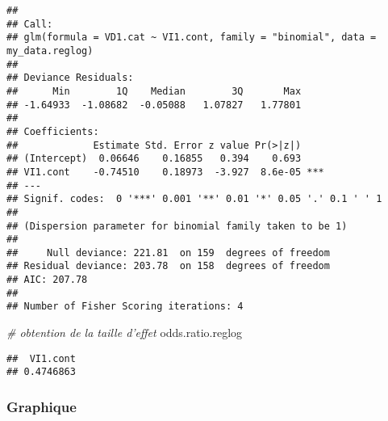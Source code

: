 \documentclass[
]{book}
\newenvironment{Shaded}{\begin{snugshade}}{\end{snugshade}}
\newcommand{\CommentTok}[1]{\textcolor[rgb]{0.56,0.35,0.01}{\textit{#1}}}
\newcommand{\NormalTok}[1]{#1}
\begin{document}
\begin{verbatim}
## 
## Call:
## glm(formula = VD1.cat ~ VI1.cont, family = "binomial", data = my_data.reglog)
## 
## Deviance Residuals: 
##      Min        1Q    Median        3Q       Max  
## -1.64933  -1.08682  -0.05088   1.07827   1.77801  
## 
## Coefficients:
##             Estimate Std. Error z value Pr(>|z|)    
## (Intercept)  0.06646    0.16855   0.394    0.693    
## VI1.cont    -0.74510    0.18973  -3.927  8.6e-05 ***
## ---
## Signif. codes:  0 '***' 0.001 '**' 0.01 '*' 0.05 '.' 0.1 ' ' 1
## 
## (Dispersion parameter for binomial family taken to be 1)
## 
##     Null deviance: 221.81  on 159  degrees of freedom
## Residual deviance: 203.78  on 158  degrees of freedom
## AIC: 207.78
## 
## Number of Fisher Scoring iterations: 4
\end{verbatim}

\begin{Shaded}
\begin{Highlighting}[]
\CommentTok{# obtention de la taille d'effet}
\NormalTok{odds.ratio.reglog}
\end{Highlighting}
\end{Shaded}

\begin{verbatim}
##  VI1.cont 
## 0.4746863
\end{verbatim}

\hypertarget{graphique-8}{%
\subsubsection{Graphique}\label{graphique-8}}
\end{document}
